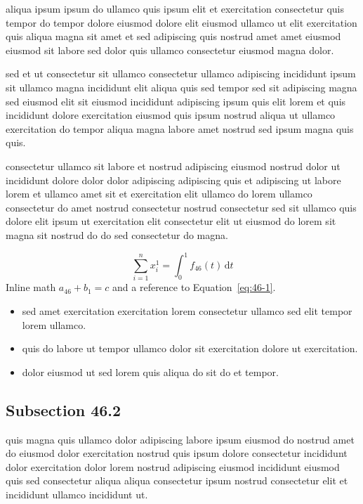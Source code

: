 \documentclass{article}
\begin{document}
aliqua ipsum ipsum do ullamco quis ipsum elit et exercitation consectetur quis tempor do tempor dolore eiusmod dolore elit eiusmod ullamco ut elit exercitation quis aliqua magna sit amet et sed adipiscing quis nostrud amet amet eiusmod eiusmod sit labore sed dolor quis ullamco consectetur eiusmod magna dolor.

sed et ut consectetur sit ullamco consectetur ullamco adipiscing incididunt ipsum sit ullamco magna incididunt elit aliqua quis sed tempor sed sit adipiscing magna sed eiusmod elit sit eiusmod incididunt adipiscing ipsum quis elit lorem et quis incididunt dolore exercitation eiusmod quis ipsum nostrud aliqua ut ullamco exercitation do tempor aliqua magna labore amet nostrud sed ipsum magna quis quis.

consectetur ullamco sit labore et nostrud adipiscing eiusmod nostrud dolor ut incididunt dolore dolor dolor adipiscing adipiscing quis et adipiscing ut labore lorem et ullamco amet sit et exercitation elit ullamco do lorem ullamco consectetur do amet nostrud consectetur nostrud consectetur sed sit ullamco quis dolore elit ipsum ut exercitation elit consectetur elit ut eiusmod do lorem sit magna sit nostrud do do sed consectetur do magna.

\begin{equation}\label{eq:46-1}
  \sum_{i=1}^{n} x_i^{1} = \int_0^1 f_{46}(t)\,\mathrm{d}t
\end{equation}
Inline math $a_{46} + b_{1} = c$ and a reference to Equation~\eqref{eq:46-1}.

\begin{itemize}
  \item sed amet exercitation exercitation lorem consectetur ullamco sed elit tempor lorem ullamco.
  \item quis do labore ut tempor ullamco dolor sit exercitation dolore ut exercitation.
  \item dolor eiusmod ut sed lorem quis aliqua do sit do et tempor.
\end{itemize}

\subsection{Subsection 46.2}\label{sec:46-2}
quis magna quis ullamco dolor adipiscing labore ipsum eiusmod do nostrud amet do eiusmod dolor exercitation nostrud quis ipsum dolore consectetur incididunt dolor exercitation dolor lorem nostrud adipiscing eiusmod incididunt eiusmod quis sed consectetur aliqua aliqua consectetur ipsum nostrud consectetur elit et incididunt ullamco incididunt ut.
\end{document}
